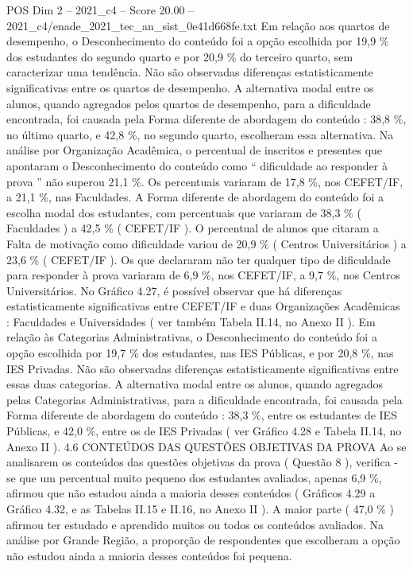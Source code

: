 \begin{textsample}{POS Dim 2 – 2021\_c4 – Score 20.00 – 2021\_c4/enade\_2021\_tec\_an\_sist\_0e41d668fe.txt}
Em relação aos quartos de desempenho, o Desconhecimento do conteúdo foi a opção escolhida por 19,9 \% dos estudantes do segundo quarto e por 20,9 \% do terceiro quarto, sem caracterizar uma tendência.
Não são observadas diferenças estatisticamente significativas entre os quartos de desempenho.
A alternativa modal entre os alunos, quando agregados pelos quartos de desempenho, para a dificuldade encontrada, foi causada pela Forma diferente de abordagem do conteúdo : 38,8 \%, no último quarto, e 42,8 \%, no segundo quarto, escolheram essa alternativa.
Na análise por Organização Acadêmica, o percentual de inscritos e presentes que apontaram o Desconhecimento do conteúdo como “ dificuldade ao responder à prova ” não superou 21,1 \%.
Os percentuais variaram de 17,8 \%, nos CEFET/IF, a 21,1 \%, nas Faculdades.
A Forma diferente de abordagem do conteúdo foi a escolha modal dos estudantes, com percentuais que variaram de 38,3 \% ( Faculdades ) a 42,5 \% ( CEFET/IF ).
O percentual de alunos que citaram a Falta de motivação como dificuldade variou de 20,9 \% ( Centros Universitários ) a 23,6 \% ( CEFET/IF ).
Os que declararam não ter qualquer tipo de dificuldade para responder à prova variaram de 6,9 \%, nos CEFET/IF, a 9,7 \%, nos Centros Universitários.
No Gráfico 4.27, é possível observar que há diferenças estatisticamente significativas entre CEFET/IF e duas Organizações Acadêmicas : Faculdades e Universidades ( ver também Tabela II.14, no Anexo II ).
Em relação às Categorias Administrativas, o Desconhecimento do conteúdo foi a opção escolhida por 19,7 \% dos estudantes, nas IES Públicas, e por 20,8 \%, nas IES Privadas.
Não são observadas diferenças estatisticamente significativas entre essas duas categorias.
A alternativa modal entre os alunos, quando agregados pelas Categorias Administrativas, para a dificuldade encontrada, foi causada pela Forma diferente de abordagem do conteúdo : 38,3 \%, entre os estudantes de IES Públicas, e 42,0 \%, entre os de IES Privadas ( ver Gráfico 4.28 e Tabela II.14, no Anexo II ). 4.6 CONTEÚDOS DAS QUESTÕES OBJETIVAS DA PROVA Ao se analisarem os conteúdos das questões objetivas da prova ( Questão 8 ), verifica -se que um percentual muito pequeno dos estudantes avaliados, apenas 6,9 \%, afirmou que não estudou ainda a maioria desses conteúdos ( Gráficos 4.29 a Gráfico 4.32, e as Tabelas II.15 e II.16, no Anexo II ).
A maior parte ( 47,0 \% ) afirmou ter estudado e aprendido muitos ou todos os conteúdos avaliados.
Na análise por Grande Região, a proporção de respondentes que escolheram a opção não estudou ainda a maioria desses conteúdos foi pequena.

\end{textsample}
